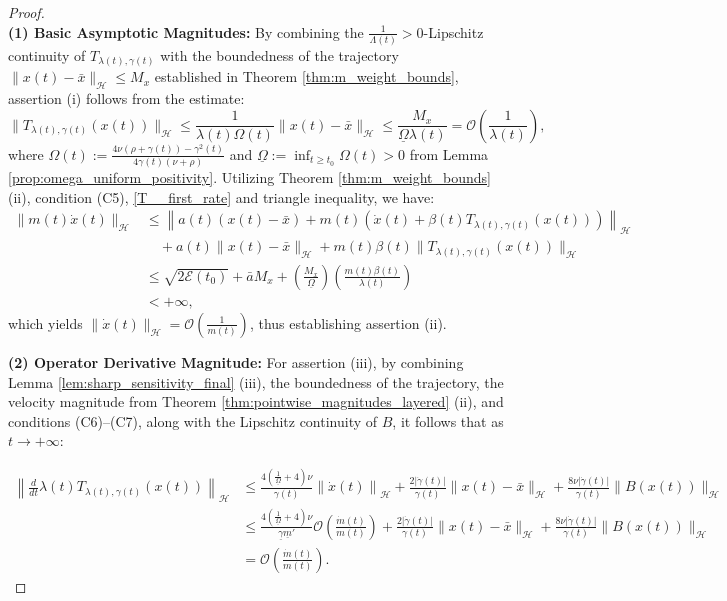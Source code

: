 \documentclass{article}
\theoremstyle{definition}
\theoremstyle{definition}
\theoremstyle{definition}
\begin{document}
\begin{proof}
\hfill \\
\noindent \textbf{(1) Basic Asymptotic Magnitudes:} By combining the $\frac{1}{\Lambda(t)}>0$-Lipschitz continuity of $T_{\lambda(t), \gamma(t)}$ with the boundedness of the trajectory $\|x(t) - \bar{x}\|_{\mathcal{H}} \le M_x$ established in Theorem \ref{thm:m_weight_bounds}, assertion (i) follows from the estimate:
\begin{equation}
\label{T__first_rate}
\|T_{\lambda(t), \gamma(t)}(x(t))\|_{\mathcal{H}} \le \frac{1}{\lambda(t) \Omega(t)} \|x(t) - \bar{x}\|_{\mathcal{H}} \le \frac{M_x}{\underline{\Omega} \lambda(t)} = \mathcal{O}\left( \frac{1}{\lambda(t)} \right),
\end{equation}
where $\Omega(t):=\frac{4\nu \left( \rho + \gamma(t) \right) - \gamma^2(t)}{4\gamma(t) \left( \nu + \rho \right)}$ and $\underline{\Omega} := \inf_{t \ge t_0} \Omega(t)> 0$ from Lemma \ref{prop:omega_uniform_positivity}. Utilizing Theorem \ref{thm:m_weight_bounds} (ii), condition (C5), \eqref{T__first_rate} and triangle inequality, we have:
\begin{align*}
\|m(t) \dot{x}(t)\|_{\mathcal{H}} &\le \left\| a(t) \left( x(t) - \bar{x} \right) + m(t) \left( \dot{x}(t) + \beta(t) T_{\lambda(t), \gamma(t)}(x(t)) \right) \right\|_{\mathcal{H}} \nonumber \\
&\quad + a(t)\|x(t) - \bar{x}\|_{\mathcal{H}} + m(t)\beta(t)\|T_{\lambda(t), \gamma(t)}(x(t))\|_{\mathcal{H}} \nonumber \\
&\le \sqrt{2\mathcal{E}(t_0)} + \bar{a} M_x + \left( \frac{M_x}{\underline{\Omega}} \right) \left( \frac{m(t)\beta(t)}{\lambda(t)} \right)\nonumber \\
&< + \infty,
\label{eq:m_isolation_refined}
\end{align*}
which yields $\|\dot{x}(t)\|_{\mathcal{H}} = \mathcal{O}\left( \frac{1}{m(t)} \right)$, thus establishing assertion (ii).

\noindent \textbf{ (2) Operator Derivative Magnitude:}
For assertion (iii), by combining Lemma \ref{lem:sharp_sensitivity_final} (iii), the boundedness of the trajectory, the velocity magnitude from Theorem \ref{thm:pointwise_magnitudes_layered} (ii), and conditions (C6)--(C7), along with the Lipschitz continuity of $B$, it follows that as $t \to +\infty$:

\begin{align}
\left\| \frac{d}{dt}\lambda(t)T_{\lambda(t),\gamma(t)}(x(t)) \right\|_{\mathcal{H}} &\le  \frac{4 \left( \frac{1}{\underline{\Omega}} + 4 \right)\nu}{\gamma(t)} \left\| \dot{x}(t) \right\|_{\mathcal{H}} + \frac{2 |\dot{\gamma}(t)|}{\gamma(t)} \| x(t) - \bar{x} \|_{\mathcal{H}} + \frac{8\nu |\dot{\gamma}(t)|}{\gamma(t)} \| B(x(t)) \|_{\mathcal{H}} \nonumber \\
&\le \frac{4 \left( \frac{1}{\underline{\Omega}} + 4 \right)\nu}{\underline{\gamma} \underline{m}'} \mathcal{O}\left( \frac{\dot{m}(t)}{m(t)} \right) +\frac{2 |\dot{\gamma}(t)|}{\gamma(t)} \| x(t) - \bar{x} \|_{\mathcal{H}} + \frac{8\nu |\dot{\gamma}(t)|}{\gamma(t)} \| B(x(t)) \|_{\mathcal{H}} \nonumber \\
&= \mathcal{O}\left( \frac{\dot{m}(t)}{m(t)} \right).
\end{align}


\end{proof}
\end{document}
